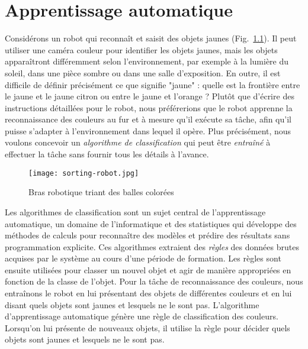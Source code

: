 
\chapter{Apprentissage automatique}\label{ch.machine}

Considérons un robot qui reconnaît et saisit des objets jaunes (Fig.~\ref{fig.sortballs}). Il peut utiliser une caméra couleur pour identifier les objets jaunes, mais les objets apparaîtront différemment selon l'environnement, par exemple à la lumière du soleil, dans une pièce sombre ou dans une salle d'exposition. En outre, il est difficile de définir précisément ce que signifie "jaune" : quelle est la frontière entre le jaune et le jaune citron ou entre le jaune et l'orange ? Plutôt que d'écrire des instructions détaillées pour le robot, nous préférerions que le robot apprenne la reconnaissance des couleurs au fur et à mesure qu'il exécute sa tâche, afin qu'il puisse s'adapter à l'environnement dans lequel il opère. Plus précisément, nous voulons concevoir un \emph{algorithme de classification} qui peut être \emph{entraîné} à effectuer la tâche sans fournir tous les détails à l'avance.

\begin{figure}
\begin{center}
\texttt{[image: sorting-robot.jpg]}
\end{center}
\caption{Bras robotique triant des balles colorées}\label{fig.sortballs}
\end{figure}

Les algorithmes de classification sont un sujet central de l'apprentissage automatique, un domaine de l'informatique et des statistiques qui développe des méthodes de calculs pour reconnaître des modèles et prédire des résultats sans programmation explicite. Ces algorithmes extraient des \emph{règles} des données brutes acquises par le système au cours d'une période de formation. Les règles sont ensuite utilisées pour classer un nouvel objet et agir de manière appropriées en fonction de la classe de l'objet. Pour la tâche de reconnaissance des couleurs, nous entraînons le robot en lui présentant des objets de différentes couleurs et en lui disant quels objets sont jaunes et lesquels ne le sont pas. L'algorithme d'apprentissage automatique génère une règle de classification des couleurs. Lorsqu'on lui présente de nouveaux objets, il utilise la règle pour décider quels objets sont jaunes et lesquels ne le sont pas.

